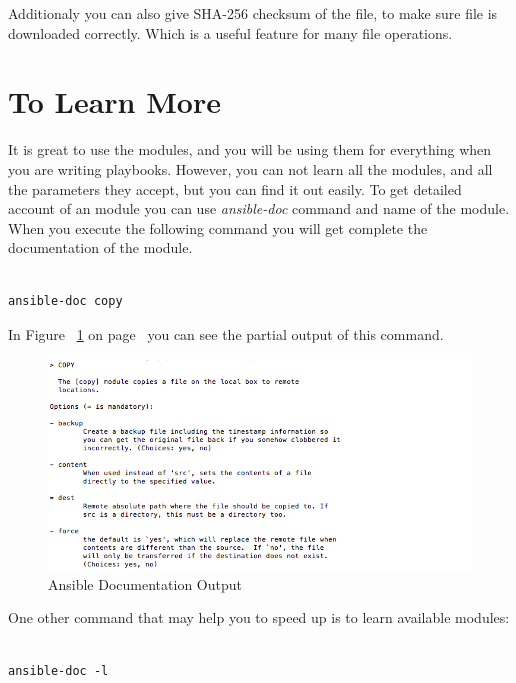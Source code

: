 \documentclass[10pt]{book}
\begin{document}
Additionaly you can also give SHA-256 checksum of the file, to make sure file is 
downloaded correctly. Which is a useful feature for many file operations.



\section{To Learn More}
It is great to use the modules, and you will be using them for everything when 
you are writing playbooks. However, you can not learn all the modules, and all 
the parameters they accept, but you can find it out easily. To get detailed 
account of an module you can use \emph{ansible-doc} command and name of the 
module. When you execute the following command you will get complete the documentation 
of the module.


\begin{Verbatim}

ansible-doc copy

\end{Verbatim}

In Figure ~\ref{fig:ansible-documentation-output} 
on page~\pageref{fig:ansible-documentation-output} you can see the partial 
output of this command.

\begin{figure}[ht]
	\centering
  \includegraphics[width=1.0\textwidth]{figures/ansible-doc-copy.png}
	\caption{Ansible Documentation Output}
		\label{fig:ansible-documentation-output}
\end{figure}

One other command that may help you to speed up is to learn available modules:

\begin{Verbatim}

ansible-doc -l

\end{Verbatim}
\end{document}
